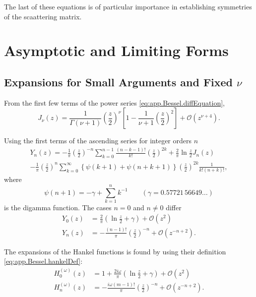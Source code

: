 The last of these equations is of particular importance in establishing
symmetries of the scaattering matrix.

\section{Asymptotic and Limiting Forms}
\subsection{Expansions for Small Arguments and Fixed $\nu$}\label{sec:app.Bessel.smallArguments}
From the first few terms of the power series \eqref{eq:app.Bessel.diffEquation}, 
  \begin{equation}
    J_\nu(z) = \frac{1}{\Gamma(\nu+1)}\left(\frac{z}{2}\right)^\nu\left[1-\frac{1}{\nu+1}\left(\frac{z}{2}\right)^2\right]+\mathcal{O}(z^{\nu+4}).
  \end{equation}
  
Using the first terms of the ascending series for integer orders $n$ \cite[\S9.1.11]{ABR1965}
  \begin{multline}
   Y_n(z)=-\frac{1}{\pi}\left(\frac{z}{2}\right)^{-n}\sum_{k=0}^{n-1}\frac{(n-k-1)!}{k!}\left(\frac{z}{2}\right)^{2k}
      +\frac{2}{\pi}\ln\frac{z}{2}J_n(z)
      \\-\frac{1}{\pi}\left(\frac{z}{2}\right)^n\sum_{k=0}^\infty\left\{\psi(k+1)+\psi(n+k+1)\right\}\left(\frac{z}{2}\right)^{2k}\frac{1}{k!(n+k)!},
  \end{multline}
where 
  \begin{equation}
   \psi(n+1) = -\gamma +\sum_{k=1}^nk^{-1}\qquad(\gamma=0.57721\,56649\ldots)
  \end{equation}
is the digamma function. The cases $n=0$ and $n\neq0$ differ
  \begin{align}
   Y_0(z)	&= \frac{2}{\pi}\left(\ln\frac{z}{2}+\gamma\right)+\mathcal{O}(z^2)	\\
   Y_n(z)	&= -\frac{(n-1)!}{\pi}\left(\frac{z}{2}\right)^{-n} +\mathcal{O}(z^{-n+2}).
  \end{align}

The expansions of the Hankel functions is found by using 
their definition \eqref{eq:app.Bessel.hankelDef}:
  \begin{align}
   H_0^{(\omega)}(z)	&=1+\frac{2i\omega}{\pi}\left(\ln\frac{z}{2}+\gamma\right)+\mathcal{O}(z^2)	\\
   H_n^{(\omega)}(z)	&=-\frac{i\omega(m-1)!}{\pi}\left(\frac{z}{2}\right)^{-n}+\mathcal{O}(z^{-n+2}).
  \end{align}

